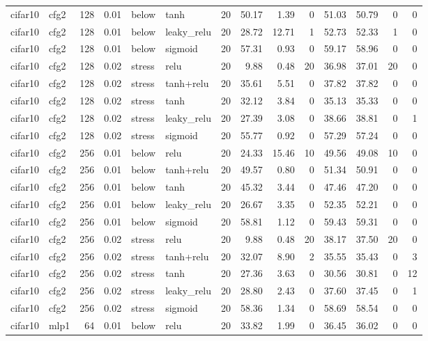 \begin{table}[htbp]
{\begin{tabular}{@{}llrrllrrrrrrrr@{}}
cifar10 & cfg2 & 128 & 0.01 & below & tanh & 20 & 50.17 & 1.39 & 0 & 51.03 & 50.79 & 0 & 0 \\
cifar10 & cfg2 & 128 & 0.01 & below & leaky\_relu & 20 & 28.72 & 12.71 & 1 & 52.73 & 52.33 & 1 & 0 \\
cifar10 & cfg2 & 128 & 0.01 & below & sigmoid & 20 & 57.31 & 0.93 & 0 & 59.17 & 58.96 & 0 & 0 \\
cifar10 & cfg2 & 128 & 0.02 & stress & relu & 20 & 9.88 & 0.48 & 20 & 36.98 & 37.01 & 20 & 0 \\
cifar10 & cfg2 & 128 & 0.02 & stress & tanh+relu & 20 & 35.61 & 5.51 & 0 & 37.82 & 37.82 & 0 & 0 \\
cifar10 & cfg2 & 128 & 0.02 & stress & tanh & 20 & 32.12 & 3.84 & 0 & 35.13 & 35.33 & 0 & 0 \\
cifar10 & cfg2 & 128 & 0.02 & stress & leaky\_relu & 20 & 27.39 & 3.08 & 0 & 38.66 & 38.81 & 0 & 1 \\
cifar10 & cfg2 & 128 & 0.02 & stress & sigmoid & 20 & 55.77 & 0.92 & 0 & 57.29 & 57.24 & 0 & 0 \\
cifar10 & cfg2 & 256 & 0.01 & below & relu & 20 & 24.33 & 15.46 & 10 & 49.56 & 49.08 & 10 & 0 \\
cifar10 & cfg2 & 256 & 0.01 & below & tanh+relu & 20 & 49.57 & 0.80 & 0 & 51.34 & 50.91 & 0 & 0 \\
cifar10 & cfg2 & 256 & 0.01 & below & tanh & 20 & 45.32 & 3.44 & 0 & 47.46 & 47.20 & 0 & 0 \\
cifar10 & cfg2 & 256 & 0.01 & below & leaky\_relu & 20 & 26.67 & 3.35 & 0 & 52.35 & 52.21 & 0 & 0 \\
cifar10 & cfg2 & 256 & 0.01 & below & sigmoid & 20 & 58.81 & 1.12 & 0 & 59.43 & 59.31 & 0 & 0 \\
cifar10 & cfg2 & 256 & 0.02 & stress & relu & 20 & 9.88 & 0.48 & 20 & 38.17 & 37.50 & 20 & 0 \\
cifar10 & cfg2 & 256 & 0.02 & stress & tanh+relu & 20 & 32.07 & 8.90 & 2 & 35.55 & 35.43 & 0 & 3 \\
cifar10 & cfg2 & 256 & 0.02 & stress & tanh & 20 & 27.36 & 3.63 & 0 & 30.56 & 30.81 & 0 & 12 \\
cifar10 & cfg2 & 256 & 0.02 & stress & leaky\_relu & 20 & 28.80 & 2.43 & 0 & 37.60 & 37.45 & 0 & 1 \\
cifar10 & cfg2 & 256 & 0.02 & stress & sigmoid & 20 & 58.36 & 1.34 & 0 & 58.69 & 58.54 & 0 & 0 \\
cifar10 & mlp1 & 64 & 0.01 & below & relu & 20 & 33.82 & 1.99 & 0 & 36.45 & 36.02 & 0 & 0 \\

\end{tabular}}
\end{table}
